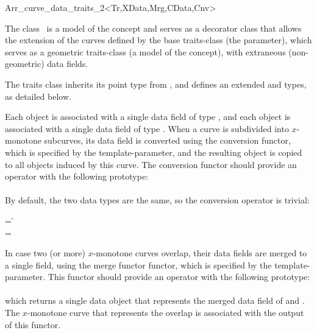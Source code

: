 
\ccRefPageBegin
\begin{ccRefClass}{Arr_curve_data_traits_2<Tr,XData,Mrg,CData,Cnv>}

\ccDefinition

The class \ccRefName\ is a model of the  concept
and serves as a decorator class that allows the extension of the curves
defined by the base traits-class (the  parameter), which serves as a
geometric traits-class (a model of the  concept), with
extraneous (non-geometric) data fields.

The traits class inherits its point type from ,
and defines an extended  and  types,
as detailed below.

Each  object is associated with a single data field of type
, and each  object is associated with
a single data field of type . When a curve is
subdivided into $x$-monotone subcurves, its data field is converted using
the conversion functor, which is specified by the  template-parameter,
and the resulting object is copied to all  objects
induced by this curve. The conversion functor should provide an operator with
the following prototype: \\
\indent {} \\

By default, the two data types are the same, so the conversion operator
is trivial:
\begin{tabbing}
 = \=\\
 = \>
\end{tabbing}

In case two (or more) $x$-monotone curves overlap, their data fields are
merged to a single field, using the merge functor functor, which is
specified by the  template-parameter. This functor should provide
an operator with the following prototype: \\
\indent {} \\
which returns a single data object that represents the merged data field
of  and . The $x$-monotone curve that represents the overlap
is associated with the output of this functor.


\end{ccRefClass}

